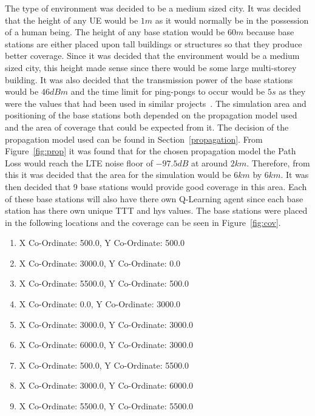 The type of environment was decided to be a medium sized city. It was decided that the height of any UE would be $1 m$ as it would normally be in the possession of a human being. The height of any base station would be $60 m$ because base stations are either placed upon tall buildings or structures so that they produce better coverage. Since it was decided that the environment would be a medium sized city, this height made sense since there would be some large multi-storey building. It was also decided that the transmission power of the base stations would be $46 dBm$ and the time limit for ping-pongs to occur would be $5 s$ as they were the values that had been used in similar projects~\cite{jansen2010handover}. The simulation area and positioning of the base stations both depended on the propagation model used and the area of coverage that could be expected from it. The decision of the propagation model used can be found in Section~\ref{propagation}. From Figure~\ref{fig:prop} it was found that for the chosen propagation model the Path Loss would reach the LTE noise floor of $-97.5 dB$ at around $2 km$. Therefore, from this it was decided that the area for the simulation would be $6 km$ by $6 km$. It was then decided that 9 base stations would provide good coverage in this area. Each of these base stations will also have there own Q-Learning agent since each base station has there own unique TTT and hys values. The base stations were placed in the following locations and the coverage can be seen in Figure~\ref{fig:cov}.
\begin{enumerate}
\item X Co-Ordinate: 500.0, Y Co-Ordinate: 500.0
\item X Co-Ordinate: 3000.0, Y Co-Ordinate: 0.0
\item X Co-Ordinate: 5500.0, Y Co-Ordinate: 500.0
\item X Co-Ordinate: 0.0, Y Co-Ordinate: 3000.0
\item X Co-Ordinate: 3000.0, Y Co-Ordinate: 3000.0
\item X Co-Ordinate: 6000.0, Y Co-Ordinate: 3000.0
\item X Co-Ordinate: 500.0, Y Co-Ordinate: 5500.0
\item X Co-Ordinate: 3000.0, Y Co-Ordinate: 6000.0
\item X Co-Ordinate: 5500.0, Y Co-Ordinate: 5500.0
\end{enumerate}
